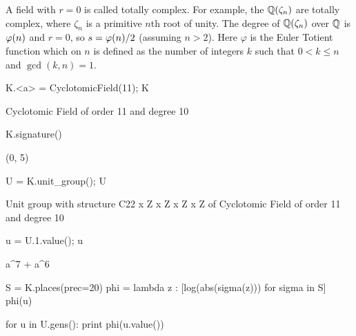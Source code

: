 A field with $r=0$ is called totally complex.  For
example, the  $\mathbb{Q}(\zeta_n)$ are totally
complex, where $\zeta_n$ is a primitive $n$th root of
unity.  The degree of $\mathbb{Q}(\zeta_n)$ over $\mathbb{Q}$ is
$\varphi(n)$ and $r=0$, so $s=\varphi(n)/2$ (assuming $n>2$).
Here $\varphi$ is the Euler Totient function which on $n$
is defined as the number of integers $k$ such that $0<k\leq n$
and $\gcd(k,n)=1$.
\begin{sagecode}
\begin{sagecell}
K.<a> = CyclotomicField(11); K
\end{sagecell}
\begin{sageout}
Cyclotomic Field of order 11 and degree 10
\end{sageout}
\begin{sagecell}
K.signature()
\end{sagecell}
\begin{sageout}
(0, 5)
\end{sageout}
\begin{sagecell}
U = K.unit_group(); U
\end{sagecell}
\begin{sageout}
Unit group with structure C22 x Z x Z x Z x Z of Cyclotomic Field
of order 11 and degree 10
\end{sageout}
\begin{sagecell}
u = U.1.value(); u
\end{sagecell}
\begin{sageout}
a^7 + a^6
\end{sageout}
\begin{sagecell}
S = K.places(prec=20)
phi = lambda z : [log(abs(sigma(z))) for sigma in S]
phi(u)
\end{sagecell}
\begin{sageout}
[-1.2566, -0.18533, 0.26982, 0.52028, 0.65180]
\end{sageout}
\begin{sagecell}
for u in U.gens():
    print phi(u.value())
\end{sagecell}
\begin{sageout}
[0.00000, 0.00000, 0.00000, -9.5367e-7, 0.00000]
[-1.2566, -0.18533, 0.26982, 0.52028, 0.65180]
[-0.26981, -0.52028, 0.18533, -0.65180, 1.2566]
[0.65180, 0.26981, -1.2566, -0.18533, 0.52029]
[-0.084486, -1.1721, -0.33496, 0.60477, 0.98675]
\end{sageout}
\end{sagecode}


